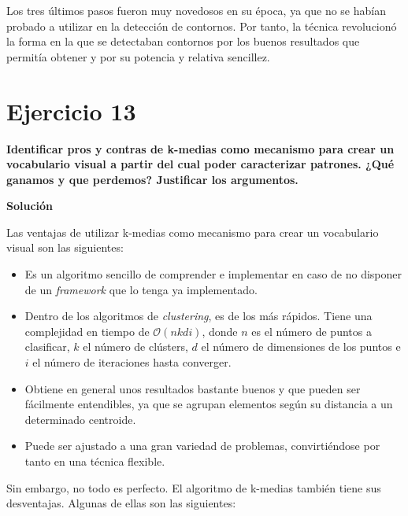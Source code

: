 \documentclass[11pt,a4paper]{article}
\newcommand{\answer}{\noindent\textbf{Solución}}
\newcommand{\question}[1]{\noindent\textbf{#1}}
\newcommand{\nonumbersection}[1]{\section*{#1}\addcontentsline{toc}{section}{#1}}
\begin{document}
Los tres últimos pasos fueron muy novedosos en su época, ya que no se habían probado a utilizar en la detección
de contornos. Por tanto, la técnica revolucionó la forma en la que se detectaban contornos por los buenos resultados
que permitía obtener y por su potencia y relativa sencillez.

\nonumbersection{Ejercicio 13}

\question{Identificar pros y contras de k-medias como mecanismo para crear un
vocabulario visual a partir del cual poder caracterizar patrones. ¿Qué
ganamos y que perdemos? Justificar los argumentos.}

\answer

Las ventajas de utilizar k-medias como mecanismo para crear un vocabulario visual son las siguientes:

\begin{itemize}
	\item Es un algoritmo sencillo de comprender e implementar en caso de no disponer de un \textit{framework} que lo tenga
	ya implementado.
	\item Dentro de los algoritmos de \textit{clustering}, es de los más rápidos. Tiene una complejidad en tiempo de
	$\mathcal{O}(nkdi)$, donde $n$ es el número de puntos a clasificar, $k$ el número de clústers, $d$ el número de
	dimensiones de los puntos e $i$ el número de iteraciones hasta converger.
	\item Obtiene en general unos resultados bastante buenos y que pueden ser fácilmente entendibles, ya que se agrupan
	elementos según su distancia a un determinado centroide.
	\item Puede ser ajustado a una gran variedad de problemas, convirtiéndose por tanto en una técnica flexible.
\end{itemize}

Sin embargo, no todo es perfecto. El algoritmo de k-medias también tiene sus desventajas. Algunas de ellas son las siguientes:
\end{document}
